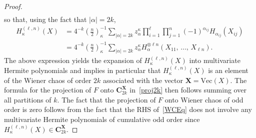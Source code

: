 \documentclass[10pt]{amsart}
\theoremstyle{definition}\newtheorem{defi}[theo]{Definition}\newtheorem{rema}[theo]{Remark}\newtheorem{exam}[theo]{Example}\newtheorem{exem}[theo]{Example}\newtheorem{nota}[theo]{Notation}
\renewcommand{\Vec}{\mathrm{Vec}}
\newcommand{\bfX}{\mathbf{X}}
\newcommand{\bfC}{\mathbf{C}}
\begin{document}
\begin{proof}
\begin{gather*}
\end{gather*}
so that, using the fact that $|\alpha|=2k$,
\begin{align*}
H_{\kappa}^{(\ell,n)}(X) &= 4^{-k} \left(\frac{n}{2}\right)_{\kappa}^{-1} \sum_{|\alpha|=2k} z_{\alpha}^{\kappa} \prod_{i=1}^{\ell} \prod_{j=1}^n (-1)^{\alpha_{ij}}H_{\alpha_{ij}}(X_{ij}) \\
&= 4^{-k} \left(\frac{n}{2}\right)_{\kappa}^{-1} \sum_{|\alpha|=2k} z_{\alpha}^{\kappa} H_{\alpha}^{\otimes \ell n}(X_{11},\,\ldots,\,X_{\ell n}).
\end{align*}
The above expression yields the expansion of $H_{\kappa}^{(\ell,n)}(X)$ into multivariate Hermite polynomials and implies in particular that $H_{\kappa}^{(\ell,n)}(X)$ is an element of the Wiener chaos of order $2k$ associated with the vector $\bfX=\Vec(X)$. The formula for the projection of $F$ onto $\bfC_{2k}^{\bfX}$ in~\eqref{proj2k} then follows summing over all partitions of $k$. The fact that the projection of $F$ onto Wiener chaos of odd order is zero follows from the fact that the RHS of~\eqref{WCEq} does not involve any multivariate Hermite polynomials of cumulative odd order since $H_{\kappa}^{(\ell,n)}(X) \in \bfC_{2k}^{\bfX}$.


\end{proof}
\end{document}
